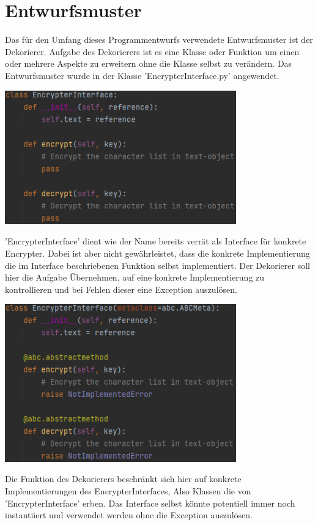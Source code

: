 \documentclass[12pt]{article}
\begin{document}
\section{Entwurfsmuster}
Das für den Umfang dieses Programmentwurfs verwendete Entwurfsmuster ist der Dekorierer. Aufgabe des Dekorierers ist es eine Klasse oder Funktion um einen oder mehrere Aspekte zu erweitern ohne die Klasse selbst zu verändern. Das Entwurfsmuster wurde in der Klasse 'EncrypterInterface.py' angewendet.
\begin{center}
	\includegraphics[width=10cm]{bilder/Decorator_before.png}
\end{center}
'EncrypterInterface' dient wie der Name bereits verrät als Interface für konkrete Encrypter. Dabei ist aber nicht gewährleistet, dass die konkrete Implementierung die im Interface beschriebenen Funktion selbst implementiert. Der Dekorierer soll hier die Aufgabe Übernehmen, auf eine konkrete Implementierung zu kontrollieren und bei Fehlen dieser eine Exception auszulösen.
\begin{center}
	\includegraphics[width=10cm]{bilder/Decorator_after.png}
\end{center}
Die Funktion des Dekorierers beschränkt sich hier auf konkrete Implementierungen des EncrypterInterfaces, Also Klassen die von 'EncrypterInterface' erben. Das Interface selbst könnte potentiell immer noch instantiiert und verwendet werden ohne die Exception auszulösen.
\end{document}
